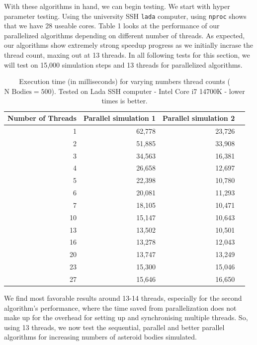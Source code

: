 \documentclass{article}
\begin{document}
With these algorithms in hand, we can begin testing. We start with hyper parameter testing. Using the university SSH \texttt{lada} computer, using \texttt{nproc} shows that we have 28 useable cores. Table 1 looks at the performance of our parallelized algorithms depending on different number of threads. As expected, our algorithms show extremely strong speedup progress as we initially incrase the thread count, maxing out at 13 threads. In all following tests for this section, we will test on 15,000 simulation steps and 13 threads for parallelized algorithms.

\begin{table}[htbp]
\centering
\begin{tabular}{|r|r|r|r|}
\hline
\textbf{Number of Threads} & \textbf{Parallel simulation 1} & \textbf{Parallel simulation 2} \\
\hline
1     & 62,778  & 23,726       \\
2     & 51,885  & 33,908       \\
3     & 34,563  & 16,381       \\
4     & 26,658  & 12,697       \\
5     & 22,398  & 10,780       \\
6     & 20,081  & 11,293       \\
7     & 18,105  & 10,471    \\
10    & 15,147  & 10,643   \\
13    & 13,502  & 10,501   \\
16    & 13,278  & 12,043   \\
20    & 13,747  & 13,249   \\
23    & 15,300  & 15,046  \\
27    & 15,646  & 16,650 \\
\hline
\end{tabular}
\caption{Execution time (in milliseconds) for varying numbers thread counts ($\text{N Bodies} = 500$). Tested on Lada SSH computer - Intel Core i7 14700K - lower times  is better.}
\label{tab:thread_performance}
\end{table}

We find most favorable results around 13-14 threads, especially for the second algorithm's performance, where the time saved from parallelization does not make up for the overhead for setting up and synchronising multiple threads. So, using 13 threads, we now test the sequential, parallel and better parallel algorithms for increasing numbers of asteroid bodies simulated.
\end{document}
